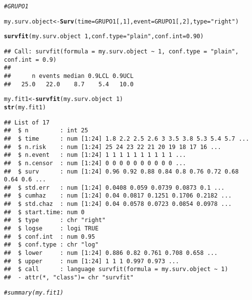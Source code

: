 \documentclass[10pt]{article}\usepackage[]{graphicx}\usepackage[]{color}
\makeatletter
\newcommand{\hlnum}[1]{\textcolor[rgb]{0.686,0.059,0.569}{#1}}%
\newcommand{\hlstr}[1]{\textcolor[rgb]{0.192,0.494,0.8}{#1}}%
\newcommand{\hlcom}[1]{\textcolor[rgb]{0.678,0.584,0.686}{\textit{#1}}}%
\newcommand{\hlopt}[1]{\textcolor[rgb]{0,0,0}{#1}}%
\newcommand{\hlstd}[1]{\textcolor[rgb]{0.345,0.345,0.345}{#1}}%
\newcommand{\hlkwb}[1]{\textcolor[rgb]{0.69,0.353,0.396}{#1}}%
\newcommand{\hlkwc}[1]{\textcolor[rgb]{0.333,0.667,0.333}{#1}}%
\newcommand{\hlkwd}[1]{\textcolor[rgb]{0.737,0.353,0.396}{\textbf{#1}}}%
\newenvironment{kframe}{%
 \def\at@end@of@kframe{}%
 \ifinner\ifhmode%
  \def\at@end@of@kframe{\end{minipage}}%
  \begin{minipage}{\columnwidth}%
 \fi\fi%
 \def\FrameCommand##1{\hskip\@totalleftmargin \hskip-\fboxsep
 \colorbox{shadecolor}{##1}\hskip-\fboxsep
     \hskip-\linewidth \hskip-\@totalleftmargin \hskip\columnwidth}%
 \MakeFramed {\advance\hsize-\width
   \@totalleftmargin\z@ \linewidth\hsize
   \@setminipage}}%
 {\par\unskip\endMakeFramed%
 \at@end@of@kframe}
\newenvironment{knitrout}{}{} %
\makeatother
\begin{document}
{\begin{itemize}
\begin{knitrout}
\begin{kframe}
\begin{alltt}
\hlcom{#GRUPO 1}

\hlstd{my.surv.object}\hlkwb{<-}\hlkwd{Surv}\hlstd{(}\hlkwc{time}\hlstd{=GRUPO1[,}\hlnum{1}\hlstd{],}\hlkwc{event} \hlstd{= GRUPO1[,}\hlnum{2}\hlstd{],} \hlkwc{type} \hlstd{=} \hlstr{"right"}\hlstd{)}

\hlkwd{survfit}\hlstd{(my.surv.object} \hlopt{~} \hlnum{1}\hlstd{,}\hlkwc{conf.type}\hlstd{=}\hlstr{"plain"}\hlstd{,} \hlkwc{conf.int}\hlstd{=}\hlnum{0.90}\hlstd{)}
\end{alltt}
\begin{verbatim}
## Call: survfit(formula = my.surv.object ~ 1, conf.type = "plain", conf.int = 0.9)
## 
##      n events median 0.9LCL 0.9UCL 
##   25.0   22.0    8.7    5.4   10.0
\end{verbatim}
\begin{alltt}
\hlstd{my.fit1}\hlkwb{<-}\hlkwd{survfit}\hlstd{(my.surv.object} \hlopt{~} \hlnum{1}\hlstd{)}
\hlkwd{str}\hlstd{(my.fit1)}
\end{alltt}
\begin{verbatim}
## List of 17
##  $ n         : int 25
##  $ time      : num [1:24] 1.8 2.2 2.5 2.6 3 3.5 3.8 5.3 5.4 5.7 ...
##  $ n.risk    : num [1:24] 25 24 23 22 21 20 19 18 17 16 ...
##  $ n.event   : num [1:24] 1 1 1 1 1 1 1 1 1 1 ...
##  $ n.censor  : num [1:24] 0 0 0 0 0 0 0 0 0 0 ...
##  $ surv      : num [1:24] 0.96 0.92 0.88 0.84 0.8 0.76 0.72 0.68 0.64 0.6 ...
##  $ std.err   : num [1:24] 0.0408 0.059 0.0739 0.0873 0.1 ...
##  $ cumhaz    : num [1:24] 0.04 0.0817 0.1251 0.1706 0.2182 ...
##  $ std.chaz  : num [1:24] 0.04 0.0578 0.0723 0.0854 0.0978 ...
##  $ start.time: num 0
##  $ type      : chr "right"
##  $ logse     : logi TRUE
##  $ conf.int  : num 0.95
##  $ conf.type : chr "log"
##  $ lower     : num [1:24] 0.886 0.82 0.761 0.708 0.658 ...
##  $ upper     : num [1:24] 1 1 1 0.997 0.973 ...
##  $ call      : language survfit(formula = my.surv.object ~ 1)
##  - attr(*, "class")= chr "survfit"
\end{verbatim}
\begin{alltt}
\hlcom{#summary(my.fit1)}


\end{alltt}
\end{kframe}
\end{knitrout}
\end{itemize}}
\end{document}
